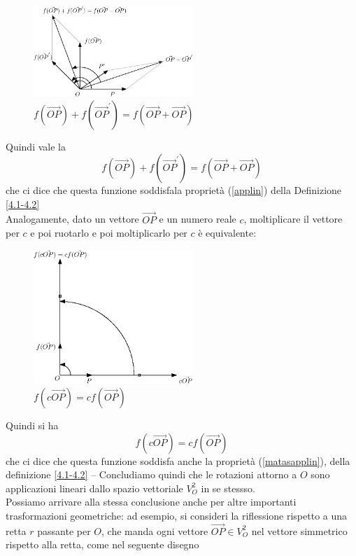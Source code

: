 \begin{definizione}
\begin{esempio}
    \clearpage
    \begin{figure}[th]
      \centering
        \includegraphics[width=6cm]{img/finiti/imgex4-2-2.eps}
      \caption{$f(\vec{OP})+f(\vec{OP}^\prime)=f(\vec{OP}+\vec{OP})$}
    \end{figure}
    Quindi vale la
    \begin{equation}
      f(\vec{OP})+f(\vec{OP}^\prime)=f(\vec{OP}+\vec{OP})
    \end{equation}
    che ci dice che questa funzione soddisfala proprietà (\ref{applin}) della Definizione \ref{4.1-4.2}\\
    Analogamente, dato un vettore $\vec{OP}$ e un numero reale $c$, moltiplicare il vettore per $c$ e poi
    ruotarlo e poi moltiplicarlo per $c$ è equivalente:
    \begin{figure}[th]
      \centering
        \includegraphics[width=6cm]{img/finiti/imgex4-2-3.eps}
      \caption{$f(c\vec{OP})=cf(\vec{OP})$}
    \end{figure}
    Quindi si ha
    \begin{equation}
      f(c\vec{OP})=cf(\vec{OP})
    \end{equation}
    che ci dice che questa funzione soddisfa anche la proprietà (\ref{matasapplin}), della definizione
    \ref{4.1-4.2} -- Concludiamo quindi che le rotazioni attorno a $O$ sono applicazioni lineari dallo
    spazio vettoriale $V_O^2$ in se stessso.\\
    Possiamo arrivare alla stessa conclusione anche per altre importanti trasformazioni geometriche: ad
    esempio, si consideri la riflessione rispetto a una retta $r$ passante per $O$, che manda ogni vettore
    $\vec{OP}\in V_O^2$ nel vettore simmetrico rispetto alla retta, come nel seguente disegno

\end{esempio}
\end{definizione}
